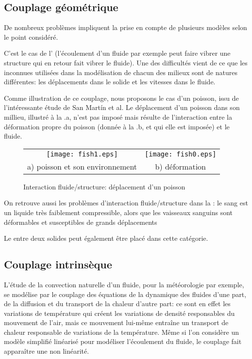 \medskip
\subsection{Couplage géométrique}
De nombreux problèmes impliquent la prise en compte de plusieurs modèles selon le point
considéré.

C'est le cas de l'
(l'écoulement d'un fluide par exemple peut faire vibrer une structure qui en retour fait vibrer le fluide).
Une des difficultés vient de ce que les inconnues utilisées dans la modélisation de chacun
des milieux sont de natures différentes: les déplacements dans le solide et les vitesses dans le fluide.

Comme illustration de ce couplage, nous proposons le cas d'un poisson, issu de l'intéressante étude de
San Mart\'in et al.
Le déplacement d'un poisson dans son millieu, illustré à la .a, n'est pas imposé mais résulte
de l'interaction entre la déformation propre du poisson (donnée à la .b, et qui elle est imposée)
et le fluide.
\begin{figure}[htb]
\begin{center}
 \begin{tabular}{cc}
  \texttt{[image: fish1.eps]} &%
  \texttt{[image: fish0.eps]}\\
  a) poisson et son environnement & b) déformation
 \end{tabular}
\end{center}
\caption{Interaction fluide/structure: déplacement d'un poisson}
\label{Fig-fish}
\end{figure}

On retrouve aussi les problèmes d'interaction fluide/structure dans la :
le sang est un liquide très faiblement compressible, alors que les vaisseaux sanguins sont déformables et susceptibles
de grands déplacements

Le  entre deux solides peut également être placé dans cette
catégorie.


\medskip
\subsection{Couplage intrinsèque}

L'étude de la convection naturelle d'un fluide, pour la météorologie par exemple, se
modélise par le couplage des équations de la dynamique des fluides d'une part, de la
diffusion et du transport de la chaleur d'autre part: ce sont en effet les variations de
température qui créent les variations de densité responsables du mouvement de l'air,
mais ce mouvement lui-même entraîne un transport de chaleur responsable de
variations de la température. Même si l'on considère un modèle simplifié
linéarisé pour modéliser l'écoulement du fluide, le couplage fait apparaître une
non linéarité.


